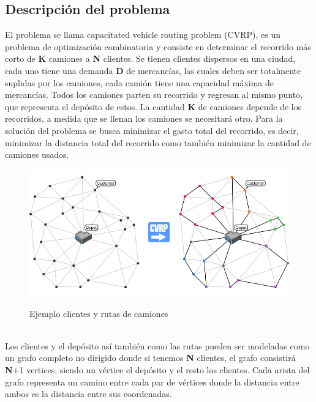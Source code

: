 \documentclass[DIV=calc, paper=a4, fontsize=11pt, twocolumn]{scrartcl}	 %
\begin{document}
\subsection*{Descripción del problema}
El problema se llama capacitated vehicle routing problem (CVRP), es un problema de optimización combinatoria y consiste en determinar el recorrido más corto de \textbf{K} camiones a \textbf{N} clientes. Se tienen clientes dispersos en una ciudad, cada uno tiene una demanda \textbf{D} de mercancías, las cuales deben ser totalmente suplidas por los camiones, cada camión tiene una capacidad máxima de mercancías. Todos los camiones parten su recorrido y regresan al mismo punto, que representa el depósito de estos. La cantidad \textbf{K} de camiones depende de los recorridos, a medida que se llenan los camiones se necesitará otro. Para la solución del problema se busca minimizar el gasto total del recorrido, es decir, minimizar la distancia total del recorrido como también minimizar la cantidad de camiones usados.
\begin{figure}[h]
\centering
\caption{Ejemplo clientes y rutas de camiones} 
\includegraphics[scale=0.4]{vrp.png} 
\label{figura 1}
\end{figure}
\\Los clientes y el depósito así también como las rutas pueden ser modeladas como un grafo completo no dirigido donde si tenemos \textbf{N} clientes, el grafo consistirá \textbf{N}+1 vertices, siendo un vértice el depósito y el resto los clientes. Cada arista del grafo representa un camino entre cada par de vértices donde la distancia entre ambos es la distancia entre sus coordenadas.
\end{document}
